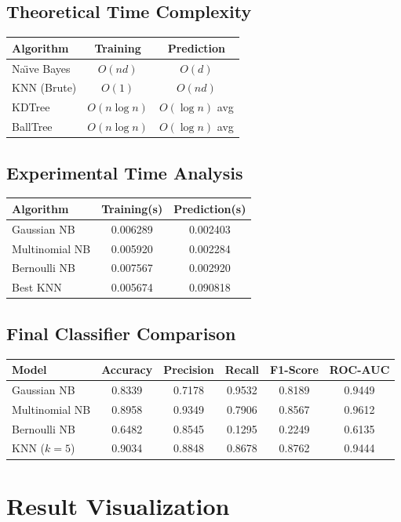 \documentclass[12pt,a4paper]{article}
\begin{document}
\subsection{Theoretical Time Complexity}
\begin{tabular}{lcc}
\toprule
Algorithm & Training & Prediction\\
\midrule
Na\"{\i}ve Bayes & $O(nd)$ & $O(d)$ \\
KNN (Brute) & $O(1)$ & $O(nd)$ \\
KDTree & $O(n\log n)$ & $O(\log n)$ avg \\
BallTree & $O(n\log n)$ & $O(\log n)$ avg \\
\bottomrule
\end{tabular}

\subsection{Experimental Time Analysis}
\begin{tabular}{lcc}
\toprule
Algorithm & Training(s) & Prediction(s)\\
\midrule
Gaussian NB     & 0.006289 & 0.002403 \\
Multinomial NB  & 0.005920 & 0.002284 \\
Bernoulli NB    & 0.007567 & 0.002920 \\
Best KNN        & 0.005674 & 0.090818 \\
\bottomrule
\end{tabular}

\subsection{Final Classifier Comparison}
\begin{tabular}{lccccc}
\toprule
Model & Accuracy & Precision & Recall & F1-Score & ROC-AUC\\
\midrule
Gaussian NB    & 0.8339 & 0.7178 & 0.9532 & 0.8189 & 0.9449 \\
Multinomial NB & 0.8958 & 0.9349 & 0.7906 & 0.8567 & 0.9612 \\
Bernoulli NB   & 0.6482 & 0.8545 & 0.1295 & 0.2249 & 0.6135 \\
KNN ($k=5$)    & 0.9034 & 0.8848 & 0.8678 & 0.8762 & 0.9444 \\
\bottomrule
\end{tabular}


\section{Result Visualization}
\end{document}
